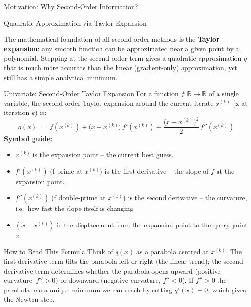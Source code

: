 \documentclass[aspectratio=169,10pt]{beamer}
\begin{document}
\begin{frame}[allowframebreaks]{Motivation: Why Second-Order Information?}
\end{frame}


\begin{frame}[allowframebreaks]{Quadratic Approximation via Taylor Expansion}

  The mathematical foundation of all second-order methods is the
  \textbf{Taylor expansion}: any smooth function can be approximated near a
  given point by a polynomial.  Stopping at the second-order term gives a
  quadratic approximation $q$ that is much more accurate than the linear
  (gradient-only) approximation, yet still has a simple analytical minimum.

  \begin{block}{Univariate: Second-Order Taylor Expansion}
    For a function $f : \mathbb{R} \to \mathbb{R}$ of a single variable, the
    second-order Taylor expansion around the current iterate $x^{(k)}$ (x at
    iteration $k$) is:
    \[
      q(x) \;=\; f\!\left(x^{(k)}\right)
              + \bigl(x - x^{(k)}\bigr)\,f'\!\left(x^{(k)}\right)
              + \frac{\bigl(x - x^{(k)}\bigr)^2}{2}\,f''\!\left(x^{(k)}\right)
    \]
    \textbf{Symbol guide:}
    \begin{itemize}
      \item $x^{(k)}$ is the expansion point -- the current best guess.
      \item $f'(x^{(k)})$ (f prime at $x^{(k)}$) is the first derivative -- the
        slope of $f$ at the expansion point.
      \item $f''(x^{(k)})$ (f double-prime at $x^{(k)}$) is the second derivative
        -- the curvature, i.e.\ how fast the slope itself is changing.
      \item $(x - x^{(k)})$ is the displacement from the expansion point to the
        query point $x$.
    \end{itemize}
  \end{block}

  \begin{alertblock}{How to Read This Formula}
    Think of $q(x)$ as a parabola centred at $x^{(k)}$.  The first-derivative
    term tilts the parabola left or right (the linear trend); the
    second-derivative term determines whether the parabola opens upward
    (positive curvature, $f'' > 0$) or downward (negative curvature, $f'' < 0$).
    If $f'' > 0$ the parabola has a unique minimum we can reach by setting
    $q'(x) = 0$, which gives the Newton step.
  \end{alertblock}


\end{frame}
\end{document}
